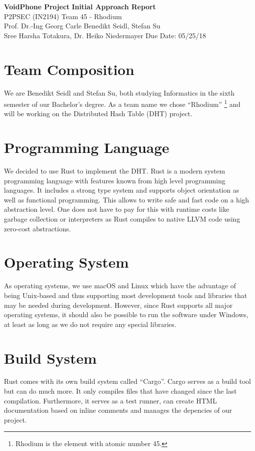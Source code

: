 \documentclass[a4paper, 11pt]{article}
\begin{document}
\noindent
\large\textbf{VoidPhone Project} \hfill \textbf{Initial Approach Report} \\
\normalsize P2PSEC (IN2194)  \hfill Team 45 - Rhodium\\
Prof. Dr.-Ing Georg Carle \hfill Benedikt Seidl, Stefan Su \\
Sree Harsha Totakura, Dr. Heiko Niedermayer \hfill Due Date: 05/25/18

\section*{Team Composition}
We are Benedikt Seidl and Stefan Su, both studying Informatics in the sixth semester of our Bachelor's degree. As a team name we chose ``Rhodium'' \footnote{Rhodium is the element with atomic number 45.} and will be working on the Distributed Hash Table (DHT) project.

\section*{Programming Language}
We decided to use Rust \cite{Rust} to implement the DHT. Rust is a modern system programming language with features known from high level programming languages. It includes a strong type system and supports object orientation as well as functional programming. This allows to write safe and fast code on a high abstraction level. One does not have to pay for this with runtime costs like garbage collection or interpreters as Rust compiles to native LLVM code using zero-cost abstractions. \cite{RustFAQ}

\section*{Operating System}
As operating systems, we use macOS and Linux which have the advantage of being Unix-based and thus supporting most development tools and libraries that may be needed during development. However, since Rust supports all major operating systems, it should also be possible to run the software under Windows, at least as long as we do not require any special libraries.

\section*{Build System}
Rust comes with its own build system called ``Cargo''. \cite{Cargo} Cargo serves as a build tool but can do much more. It only compiles files that have changed since the last compilation. Furthermore, it serves as a test runner, can create HTML documentation based on inline comments and manages the depencies of our project.
\end{document}
